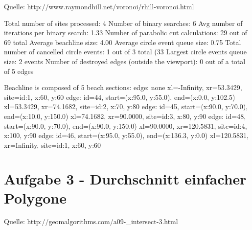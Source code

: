 \documentclass[a4paper]{article}
\begin{document}
\begin{figure} [!htb]
\end{figure} 

Quelle: http://www.raymondhill.net/voronoi/rhill-voronoi.html

Total number of sites processed: 4
Number of binary searches: 6
Avg number of iterations per binary search: 1.33
Number of parabolic cut calculations: 29 out of 69 total
Average beachline size: 4.00
Average circle event queue size: 0.75
Total number of cancelled circle events: 1 out of 3 total (33%
Largest circle events queue size: 2 events
Number of destroyed edges (outside the viewport): 0 out of a total of 5 edges

Beachline is composed of 5 beach sections:
edge: none
xl=-Infinity, xr=53.3429, site={id:1, x:60, y:60}
edge: id=44, start=(x:95.0, y:55.0), end=(x:0.0, y:102.5)
xl=53.3429, xr=74.1682, site={id:2, x:70, y:80}
edge: id=45, start=(x:90.0, y:70.0), end=(x:10.0, y:150.0)
xl=74.1682, xr=90.0000, site={id:3, x:80, y:90}
edge: id=48, start=(x:90.0, y:70.0), end=(x:90.0, y:150.0)
xl=90.0000, xr=120.5831, site={id:4, x:100, y:90}
edge: id=46, start=(x:95.0, y:55.0), end=(x:136.3, y:0.0)
xl=120.5831, xr=Infinity, site={id:1, x:60, y:60}

\section*{Aufgabe 3 - Durchschnitt einfacher Polygone}

Quelle: http://geomalgorithms.com/a09-_intersect-3.html
\end{document}
